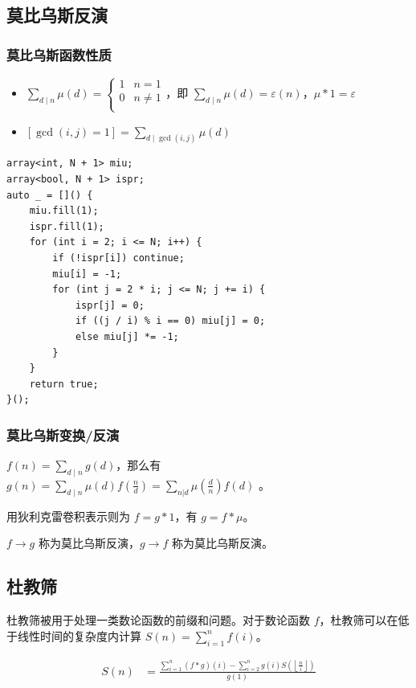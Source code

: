 \documentclass[UTF8]{ctexart}
\begin{document}
\begin{sloppypar}
\subsection{莫比乌斯反演}

\subsubsection{莫比乌斯函数性质}

\begin{itemize}
   \item $\sum_{d\mid n}\mu(d)=\begin{cases}1&n=1\\0&n\neq 1\\\end{cases}$，即 $\sum_{d\mid n}\mu(d)=\varepsilon(n)$，$\mu * 1 =\varepsilon$
   \item $\displaystyle [\gcd(i,j)=1]=\sum_{d\mid\gcd(i,j)}\mu(d)$
\end{itemize}

\begin{lstlisting}[style=cpp]
array<int, N + 1> miu;
array<bool, N + 1> ispr;
auto _ = []() {
    miu.fill(1);
    ispr.fill(1);
    for (int i = 2; i <= N; i++) {
        if (!ispr[i]) continue;
        miu[i] = -1;
        for (int j = 2 * i; j <= N; j += i) {
            ispr[j] = 0;
            if ((j / i) % i == 0) miu[j] = 0;
            else miu[j] *= -1;
        }
    }
    return true;
}();
\end{lstlisting}

\subsubsection{莫比乌斯变换/反演}

$f(n)=\sum_{d\mid n}g(d)$，那么有 $g(n)=\sum_{d\mid n}\mu(d)f(\frac{n}{d})=\sum_{n|d}\mu(\frac{d}{n})f(d)$
。

用狄利克雷卷积表示则为 $f=g\ast1$，有 $g=f\ast\mu$。

$f \rightarrow g$ 称为莫比乌斯反演，$g \rightarrow f$ 称为莫比乌斯反演。

\subsection{杜教筛}

杜教筛被用于处理一类数论函数的前缀和问题。对于数论函数 $f$，杜教筛可以在低于线性时间的复杂度内计算 $S(n)=\sum_{i=1}^{n}f(i)$。

$$
\begin{aligned}
    S(n) & = \frac{\sum_{i=1}^n (f * g)(i) - \sum_{i=2}^n g(i)S\left(\left\lfloor\frac{n}{i}\right\rfloor\right)}{g(1)}
\end{aligned}
$$


\end{sloppypar}
\end{document}
